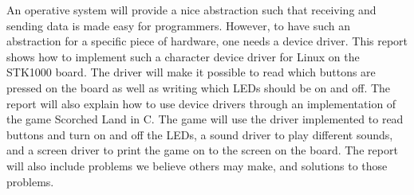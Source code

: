 An operative system will provide a nice abstraction such that receiving
and sending data is made easy for programmers. However, to have such an
abstraction for a specific piece of hardware, one needs a device driver.
This report shows how to implement such a character device driver for
Linux on the STK1000 board. The driver will make it possible to read
which buttons are pressed on the board as well as writing which LEDs
should be on and off. The report will also explain how to use device
drivers through an implementation of the game Scorched Land in C. The
game will use the driver implemented to read buttons and turn on and off
the LEDs, a sound driver to play different sounds, and a screen driver
to print the game on to the screen on the board. The report will also
include problems we believe others may make, and solutions to those
problems.
